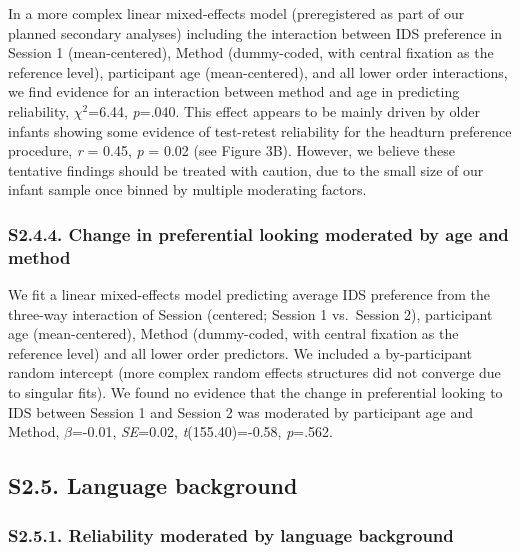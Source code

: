 \documentclass[
  man, donotrepeattitle,floatsintext]{apa6}
\begin{document}
In a more complex linear mixed-effects model (preregistered as part of our planned secondary analyses) including the interaction between IDS preference in Session 1 (mean-centered), Method (dummy-coded, with central fixation as the reference level), participant age (mean-centered), and all lower order interactions, we find evidence for an interaction between method and age in predicting reliability, \({\chi}^2\)=6.44, \emph{p}=.040.
This effect appears to be mainly driven by older infants showing some evidence of test-retest reliability for the headturn preference procedure, \emph{r} = 0.45, \emph{p} = 0.02 (see Figure 3B).
However, we believe these tentative findings should be treated with caution, due to the small size of our infant sample once binned by multiple moderating factors.

\hypertarget{s2.4.4.-change-in-preferential-looking-moderated-by-age-and-method}{%
\subsubsection{S2.4.4. Change in preferential looking moderated by age and method}\label{s2.4.4.-change-in-preferential-looking-moderated-by-age-and-method}}

We fit a linear mixed-effects model predicting average IDS preference from the three-way interaction of Session (centered; Session 1 vs.~Session 2), participant age (mean-centered), Method (dummy-coded, with central fixation as the reference level) and all lower order predictors.
We included a by-participant random intercept (more complex random effects structures did not converge due to singular fits).
We found no evidence that the change in preferential looking to IDS between Session 1 and Session 2 was moderated by participant age and Method, \(\beta\)=-0.01, \emph{SE}=0.02, \emph{t}(155.40)=-0.58, \emph{p}=.562.

\hypertarget{s2.5.-language-background}{%
\subsection{S2.5. Language background}\label{s2.5.-language-background}}

\hypertarget{s2.5.1.-reliability-moderated-by-language-background}{%
\subsubsection{S2.5.1. Reliability moderated by language background}\label{s2.5.1.-reliability-moderated-by-language-background}}
\end{document}
